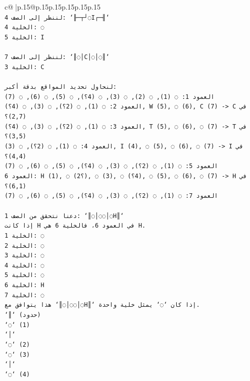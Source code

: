 \documentclass{article}
\begin{document}
{\begin{supertabular}{c@{$\;$}|p{.15\linewidth}@{}p{.15\linewidth}p{.15\linewidth}p{.15\linewidth}p{.15\linewidth}p{.15\linewidth}}
{{{\\ 
\texttt{لننظر إلى الصف 4: `╟─┬┘◌I┌─╢`} \\
\texttt{الخلية 4: ◌} \\
\texttt{الخلية 5: I} \\
\\ 
\texttt{لننظر إلى الصف 7: `║◌│C│◌│◌║`} \\
\texttt{الخلية 3: C} \\
\\ 
\texttt{لنحاول تحديد المواقع بدقة أكبر:} \\
\texttt{العمود 1: ◌ (1), ◌ (2), ◌ (3), ◌ (4؟), ◌ (5), ◌ (6), ◌ (7)} \\
\texttt{العمود 2: ◌ (1), ◌ (2؟), ◌ (3), ◌ (4؟), W (5), ◌ (6), C (7) {-}> C في (2,7)؟} \\
\texttt{العمود 3: ◌ (1), ◌ (2؟), ◌ (3), ◌ (4؟), T (5), ◌ (6), ◌ (7) {-}> T في (3,5)؟} \\
\texttt{العمود 4: ◌ (1), ◌ (2؟), ◌ (3), I (4), ◌ (5), ◌ (6), ◌ (7) {-}> I في (4,4)؟} \\
\texttt{العمود 5: ◌ (1), ◌ (2؟), ◌ (3), ◌ (4؟), ◌ (5), ◌ (6), ◌ (7)} \\
\texttt{العمود 6: H (1), ◌ (2؟), ◌ (3), ◌ (4؟), ◌ (5), ◌ (6), ◌ (7) {-}> H في (6,1)؟} \\
\texttt{العمود 7: ◌ (1), ◌ (2؟), ◌ (3), ◌ (4؟), ◌ (5), ◌ (6), ◌ (7)} \\
\\ 
\texttt{دعنا نتحقق من الصف 1: `║◌│◌◌│◌H║`} \\
\texttt{إذا كانت H في العمود 6، فالخلية 6 هي H.} \\
\texttt{الخلية 1: ◌} \\
\texttt{الخلية 2: ◌} \\
\texttt{الخلية 3: ◌} \\
\texttt{الخلية 4: ◌} \\
\texttt{الخلية 5: ◌} \\
\texttt{الخلية 6: H} \\
\texttt{الخلية 7: ◌} \\
\texttt{هذا يتوافق مع `║◌│◌◌│◌H║` إذا كان `◌` يمثل خلية واحدة.} \\
\texttt{`║` (حدود)} \\
\texttt{`◌` (1)} \\
\texttt{`│`} \\
\texttt{`◌` (2)} \\
\texttt{`◌` (3)} \\
\texttt{`│`} \\
\texttt{`◌` (4)} \\
}}}
\end{supertabular}}
\end{document}
